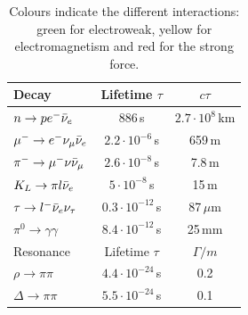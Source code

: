\documentclass[../main.tex]{subfiles}
\begin{document}
\begin{table}[h]
    \centering
    \begin{tabular}{lcc}
    \hline
    \rowcolor{gray!45}Decay & Lifetime $\tau$ & $c\tau$\\
    \hline
    \rowcolor{green!45}$n\to pe^-\Bar{\nu}_e$ & 886\,s &$2.7\cdot10^8$\,km \\
    \rowcolor{green!45}$\mu^-\to e^-\nu_\mu\Bar{\nu}_e$ & $2.2\cdot10^{-6}$\,s & 659\,m\\
    \rowcolor{green!45}$\pi^-\to \mu^-\nu\Bar{\nu}_\mu$ & $2.6\cdot10^{-8}$\,s & 7.8\,m\\
    \rowcolor{green!45}$K_L\to\pi l\Bar{\nu}_e$ & $5\cdot10^{-8}$\,s & 15\,m\\
    \rowcolor{green!45}$\tau\to l^-\Bar{\nu}_e\nu_\tau$ & $0.3\cdot10^{-12}$\,s & 87\,$\mu$m\\
    \rowcolor{yellow!45}$\pi^0\to\gamma\gamma$ & $8.4\cdot10^{-12}$\,s & 25\,mm\\
    \hline\hline
    \rowcolor{gray!45}Resonance & Lifetime $\tau$ & $\Gamma/m$\\
    \hline
    \rowcolor{red!45}$\rho\to\pi\pi$ & $4.4\cdot10^{-24}$\,s & 0.2\\
    \rowcolor{red!45}$\Delta\to\pi\pi$ & $5.5\cdot10^{-24}$\,s & 0.1\\
    \hline
    \end{tabular}
    \caption{Colours indicate the different interactions: green for electroweak, yellow for electromagnetism and red for the strong force.}
    \label{tab:my_label}
\end{table}\\
\end{document}
